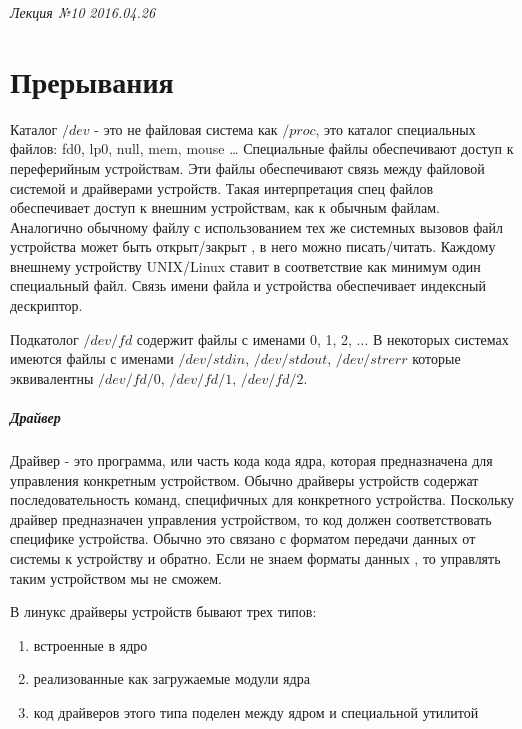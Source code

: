\clearpage
\begin{flushright}
	\textit{Лекция №10}
	\textit{2016.04.26}
\end{flushright}

\chapter{Прерывания}

Каталог $/dev$ - это не файловая система как $/proc$, это каталог специальных файлов: fd0, lp0, null, mem, mouse … Специальные файлы обеспечивают доступ к переферийным устройствам. Эти файлы обеспечивают связь между файловой системой и драйверами устройств. Такая интерпретация спец файлов обеспечивает доступ к внешним устройствам, как к обычным файлам. Аналогично обычному файлу с использованием тех же системных вызовов файл устройства может быть открыт/закрыт , в него можно писать/читать. Каждому внешнему устройству UNIX/Linux ставит в соответствие как минимум один специальный файл. Связь имени файла и устройства обеспечивает индексный дескриптор.

Подкатолог $/dev/fd$ содержит файлы с именами 0, 1, 2, ... В некоторых системах имеются файлы с именами
$/dev/stdin$, $/dev/stdout$, $/dev/strerr$ которые эквивалентны $/dev/fd/0$, $/dev/fd/1$, $/dev/fd/2$.

\paragraph{Драйвер}

Драйвер - это программа, или часть кода кода ядра, которая предназначена для управления конкретным устройством. Обычно драйверы устройств содержат последовательность команд, специфичных для конкретного устройства. Поскольку драйвер предназначен управления устройством, то код должен соответствовать специфике устройства. Обычно это связано с форматом передачи данных от системы к устройству и обратно. Если не знаем форматы данных , то управлять таким устройством мы не сможем.

В линукс драйверы устройств бывают трех типов:
\begin{enumerate}
	\item встроенные в ядро
	\item реализованные как загружаемые модули ядра
	\item код  драйверов этого типа поделен между ядром и специальной утилитой
\end{enumerate}

